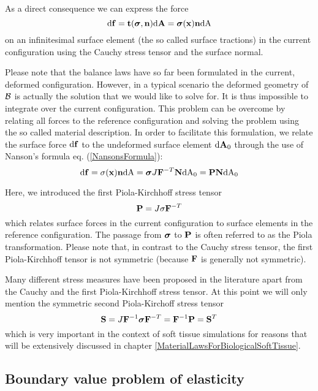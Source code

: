 As a direct consequence we can express the force
\begin{equation}
\textnormal{d} \mathbf {f}  =  \mathbf {t}  (\boldsymbol{\sigma} , \mathbf {n}  )  \textnormal{d}\mathbf{A} = \boldsymbol{\sigma} (\mathbf {x} ) \mathbf {n}   \textnormal{dA}
\label{SurfaceTractions}
\end{equation}
on an infinitesimal surface element (the so called surface tractions) in the current configuration using the Cauchy stress tensor and the surface normal. 

Please note that the balance laws have so far been formulated in the current, deformed configuration. However, in a typical scenario the deformed geometry of $\mathcal{B} $ is actually the solution that we would like to solve for. It is thus impossible to integrate over the current configuration. This problem can be overcome by relating all forces to the reference configuration and solving the problem using the so called material description. In order to facilitate this formulation, we relate the surface force $\textnormal{d} \mathbf {f} $ to the undeformed surface element $ \textnormal{d}\mathbf{A}_0$ through the use of Nanson's formula eq. (\ref{NansonsFormula}):
\begin{equation}
\textnormal{d} \mathbf {f}  = \sigma (\mathbf {x} ) \mathbf {n}   \textnormal{dA} = \boldsymbol{\sigma} J \mathbf {F }^{-T} \mathbf {N}   \textnormal{dA}_0 = \mathbf {\mathbf {P} } \mathbf {N}   \textnormal{dA}_0
\end{equation}

Here, we introduced the first Piola-Kirchhoff stress tensor 
\begin{equation}
\mathbf {P}   =  J \sigma \mathbf {F }^{-T} 
\label{FirstPiolaKirchhoff}
\end{equation}
which relates surface forces in the current configuration to surface elements in the reference configuration. The passage from $\boldsymbol{\sigma}$ to $\mathbf {P} $ is often referred to as the Piola transformation. Please note that, in contrast to the Cauchy stress tensor, the first Piola-Kirchhoff tensor is not symmetric (because $\mathbf {F }$ is generally not symmetric). 

Many different stress measures have been proposed in the literature apart from the Cauchy and the first Piola-Kirchhoff stress tensor. At this point we will only mention the symmetric second Piola-Kirchoff stress tensor 
\begin{equation}
\mathbf {S}   =  J \mathbf {F } ^{-1} \boldsymbol{\sigma} \mathbf {F }^{-T}  = \mathbf {F } ^{-1} \mathbf {P}  = \mathbf {S}  ^T
\end{equation}
which is very important in the context of soft tissue simulations for reasons that will be extensively discussed in chapter \ref{MaterialLawsForBiologicalSoftTissue}.


\subsection{Boundary value problem of elasticity}

